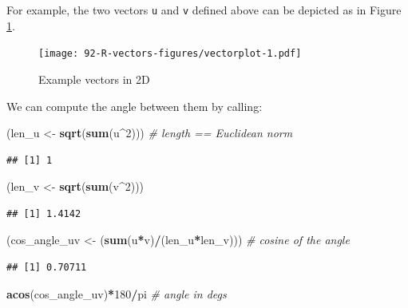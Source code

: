 \documentclass[10pt,b5paper,krantz1]{krantz}
\newenvironment{Shaded}{\begin{snugshade}}{\end{snugshade}}
\newcommand{\CommentTok}[1]{\textcolor[rgb]{0.37,0.37,0.37}{\textit{#1}}}
\newcommand{\DecValTok}[1]{\textcolor[rgb]{0.06,0.06,0.06}{#1}}
\newcommand{\KeywordTok}[1]{\textcolor[rgb]{0.27,0.27,0.27}{\textbf{#1}}}
\newcommand{\NormalTok}[1]{#1}
\newcommand{\OperatorTok}[1]{\textcolor[rgb]{0.43,0.43,0.43}{\textbf{#1}}}
\newcommand{\StringTok}[1]{\textcolor[rgb]{0.5,0.5,0.5}{#1}}
\begin{document}
For example, the two vectors \texttt{u} and \texttt{v} defined above
can be depicted as in Figure \ref{fig:vectorplot}.

\begin{figure}
\hypertarget{fig:vectorplot}{%
\centering
\texttt{[image: 92-R-vectors-figures/vectorplot-1.pdf]}
\caption{Example vectors in 2D}\label{fig:vectorplot}
}
\end{figure}

We can compute the angle between them by calling:

\begin{Shaded}
\begin{Highlighting}[]
\NormalTok{(len_u <-}\StringTok{ }\KeywordTok{sqrt}\NormalTok{(}\KeywordTok{sum}\NormalTok{(u}\OperatorTok{^}\DecValTok{2}\NormalTok{))) }\CommentTok{# length == Euclidean norm}
\end{Highlighting}
\end{Shaded}

\begin{verbatim}
## [1] 1
\end{verbatim}

\begin{Shaded}
\begin{Highlighting}[]
\NormalTok{(len_v <-}\StringTok{ }\KeywordTok{sqrt}\NormalTok{(}\KeywordTok{sum}\NormalTok{(v}\OperatorTok{^}\DecValTok{2}\NormalTok{)))}
\end{Highlighting}
\end{Shaded}

\begin{verbatim}
## [1] 1.4142
\end{verbatim}

\begin{Shaded}
\begin{Highlighting}[]
\NormalTok{(cos_angle_uv <-}\StringTok{ }\NormalTok{(}\KeywordTok{sum}\NormalTok{(u}\OperatorTok{*}\NormalTok{v)}\OperatorTok{/}\NormalTok{(len_u}\OperatorTok{*}\NormalTok{len_v))) }\CommentTok{# cosine of the angle}
\end{Highlighting}
\end{Shaded}

\begin{verbatim}
## [1] 0.70711
\end{verbatim}

\begin{Shaded}
\begin{Highlighting}[]
\KeywordTok{acos}\NormalTok{(cos_angle_uv)}\OperatorTok{*}\DecValTok{180}\OperatorTok{/}\NormalTok{pi }\CommentTok{# angle in degs}
\end{Highlighting}
\end{Shaded}
\end{document}

